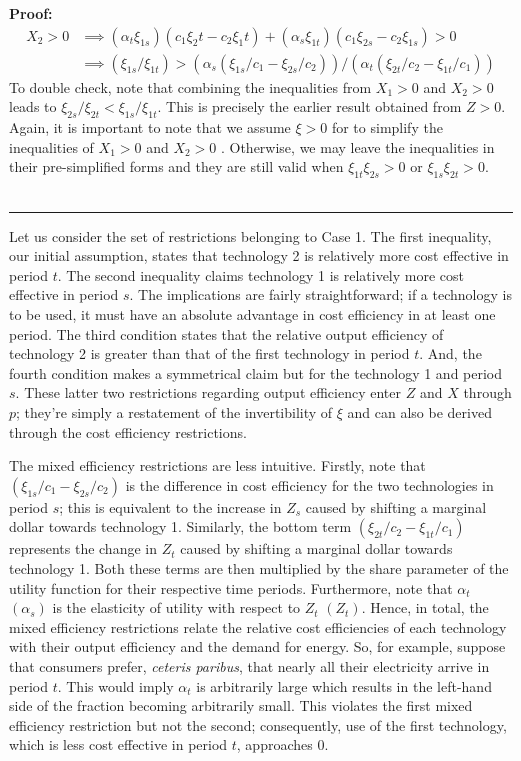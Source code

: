 \documentclass[12pt,a4paper]{extarticle}
\newenvironment{proof}[1][Proof]{\noindent\textbf{#1:} }{\ \rule{0.5em}{0.5em}}
\begin{document}
\begin{proof}
	\begin{align*}
	X_2 > 0 &\implies (\alpha_t \xi_{1s})(c_1 \xi_2t - c_2\xi_1t) + (\alpha_s \xi_{1t})(c_1 \xi_{2s} - c_2 \xi_{1s}) > 0\\
	&\implies (\xi_{1s}/\xi_{1t}) > (\alpha_s (\xi_{1s}/c_1 -  \xi_{2s}/c_2))/(\alpha_t(\xi_{2t}/c_2 - \xi_{1t}/c_1)) 
	\end{align*}
	To double check, note that combining the inequalities from $X_1>0$ and $X_2 > 0$ leads to $\xi_{2s}/\xi_{2t} < \xi_{1s}/\xi_{1t}$. This is precisely the earlier result obtained from $Z > 0$. Again, it is  important to note that we assume $\xi > 0$ for to simplify the inequalities of $X_1 > 0$ and $X_2 > 0$ . Otherwise, we may leave the inequalities in their pre-simplified forms and they are still valid when  $\xi_{1t} \xi_{2s} > 0$ or $\xi_{1s} \xi_{2t} > 0$.   \\ \hfill
\end{proof}

Let us consider the set of restrictions belonging to Case 1. The first inequality, our initial assumption, states that technology 2 is relatively more cost effective in period $t$. The second inequality claims technology 1 is relatively more cost effective in period $s$. The implications are fairly straightforward; if a technology is to be used, it must have an absolute advantage in cost efficiency in at least one period. The third condition states that the relative output efficiency of technology 2 is greater than that of the first technology in period $t$. And, the fourth condition makes a symmetrical claim but for the technology 1 and period $s$. These latter two restrictions regarding output efficiency enter $Z$ and $X$ through $p$; they're simply a restatement of the invertibility of $\xi$ and can also be derived through the cost efficiency restrictions. 

The mixed efficiency restrictions are less intuitive. Firstly, note that $\left(\xi_{1s}/c_1 - \xi_{2s}/c_2\right)$ is the difference in cost efficiency for the two technologies in period $s$; this is equivalent to the increase in $Z_s$ caused by shifting a marginal dollar towards technology 1. Similarly, the bottom term $\left( \xi_{2t}/c_2 - \xi_{1t}/c_1 \right)$ represents the change in $Z_t$ caused by shifting a marginal dollar towards technology 1. Both these terms are then multiplied by the share parameter of the utility function for their respective time periods. Furthermore, note that $\alpha_t$ $(\alpha_s)$ is the elasticity of utility with respect to $Z_t$ $(Z_t)$. Hence, in total, the mixed efficiency restrictions relate the relative cost efficiencies of each technology with their output efficiency and the demand for energy. So, for example, suppose that consumers prefer, \textit{ceteris paribus}, that nearly all their electricity arrive in period $t$. This would imply $\alpha_t$ is arbitrarily large which results in the left-hand side of the fraction becoming arbitrarily small. This violates the first mixed efficiency restriction but not the second; consequently, use of the first technology, which is less cost effective in period $t$, approaches $0$. 
\end{document}
